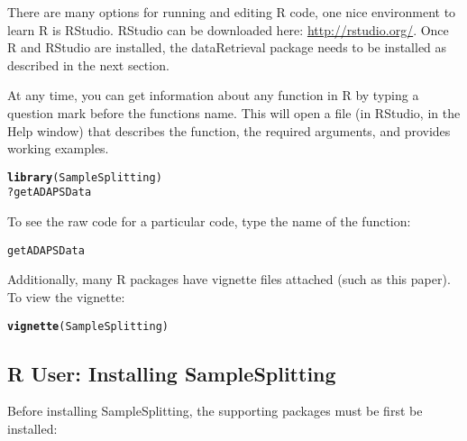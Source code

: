 \documentclass[a4paper,11pt]{article}\usepackage[]{graphicx}\usepackage[]{color}
\makeatletter
\newcommand{\hlopt}[1]{\textcolor[rgb]{0,0,0}{#1}}%
\newcommand{\hlstd}[1]{\textcolor[rgb]{0.345,0.345,0.345}{#1}}%
\newcommand{\hlkwd}[1]{\textcolor[rgb]{0.737,0.353,0.396}{\textbf{#1}}}%
\newenvironment{kframe}{%
 \def\at@end@of@kframe{}%
 \ifinner\ifhmode%
  \def\at@end@of@kframe{\end{minipage}}%
  \begin{minipage}{\columnwidth}%
 \fi\fi%
 \def\FrameCommand##1{\hskip\@totalleftmargin \hskip-\fboxsep
 \colorbox{shadecolor}{##1}\hskip-\fboxsep
     \hskip-\linewidth \hskip-\@totalleftmargin \hskip\columnwidth}%
 \MakeFramed {\advance\hsize-\width
   \@totalleftmargin\z@ \linewidth\hsize
   \@setminipage}}%
 {\par\unskip\endMakeFramed%
 \at@end@of@kframe}
\newenvironment{knitrout}{}{} %
\makeatother
\begin{document}
There are many options for running and editing R code, one nice environment to learn R is RStudio. RStudio can be downloaded here: \url{http://rstudio.org/}. Once R and RStudio are installed, the dataRetrieval package needs to be installed as described in the next section.

At any time, you can get information about any function in R by typing a question mark before the functions name.  This will open a file (in RStudio, in the Help window) that describes the function, the required arguments, and provides working examples.

\begin{knitrout}
\color{fgcolor}\begin{kframe}
\begin{alltt}
\hlkwd{library}\hlstd{(SampleSplitting)}
\hlopt{?}\hlstd{getADAPSData}
\end{alltt}
\end{kframe}
\end{knitrout}


To see the raw code for a particular code, type the name of the function:
\begin{knitrout}
\color{fgcolor}\begin{kframe}
\begin{alltt}
\hlstd{getADAPSData}
\end{alltt}
\end{kframe}
\end{knitrout}


Additionally, many R packages have vignette files attached (such as this paper). To view the vignette:
\begin{knitrout}
\color{fgcolor}\begin{kframe}
\begin{alltt}
\hlkwd{vignette}\hlstd{(SampleSplitting)}
\end{alltt}
\end{kframe}
\end{knitrout}


\FloatBarrier
\clearpage
\subsection{R User: Installing SampleSplitting}
Before installing SampleSplitting, the supporting packages must be first be installed:
\end{document}
